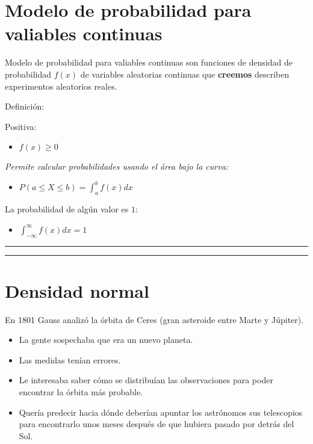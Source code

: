 \documentclass[
]{book}
\providecommand{\tightlist}{%
  \setlength{\itemsep}{0pt}\setlength{\parskip}{0pt}}
\begin{document}
\hypertarget{modelo-de-probabilidad-para-valiables-continuas}{%
\section{Modelo de probabilidad para valiables continuas}\label{modelo-de-probabilidad-para-valiables-continuas}}

Modelo de probabilidad para valiables continuas son funciones de densidad de probabilidad \(f(x)\) de variables aleatorias continuas que \textbf{creemos} describen experimentos aleatorios reales.

Definición:

Positiva:

\begin{itemize}
\tightlist
\item
  \(f(x) \geq 0\)
\end{itemize}

\emph{Permite calcular probabilidades usando el área bajo la curva:}

\begin{itemize}
\tightlist
\item
  \(P(a\leq X \leq b)=\int_{a}^{b} f(x) dx\)
\end{itemize}

La probabilidad de algún valor es \(1\):

\begin{itemize}
\tightlist
\item
  \(\int_{-\infty}^{\infty} f(x) dx = 1\)
\end{itemize}

\begin{center}\rule{0.5\linewidth}{0.5pt}\end{center}

\begin{center}\rule{0.5\linewidth}{0.5pt}\end{center}

\hypertarget{densidad-normal}{%
\section{Densidad normal}\label{densidad-normal}}

En 1801 Gauss analizó la órbita de Ceres (gran asteroide entre Marte y Júpiter).

\begin{itemize}
\tightlist
\item
  La gente sospechaba que era un nuevo planeta.
\item
  Las medidas tenían errores.
\item
  Le interesaba saber cómo se distribuían las observaciones para poder encontrar la órbita más probable.
\item
  Quería predecir hacia dónde deberían apuntar los astrónomos sus telescopios para encontrarlo unos meses después de que hubiera pasado por detrás del Sol.
\end{itemize}
\end{document}
